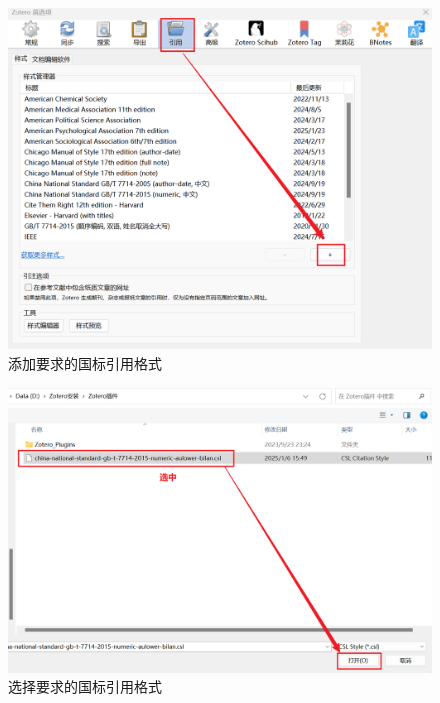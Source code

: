 \documentclass[]{ctexbook}
\theoremstyle{definition}
\theoremstyle{definition}
\theoremstyle{definition}
\theoremstyle{definition}
\theoremstyle{remark}
\begin{document}
\begin{figure}

{\centering \includegraphics[width=1\linewidth]{img/zotero-cite-cn/ciation_setting_1} 

}

\caption{添加要求的国标引用格式}\label{fig:ciation-setting-load}
\end{figure}

\begin{figure}

{\centering \includegraphics[width=1\linewidth]{img/zotero-cite-cn/ciation_setting_2} 

}

\caption{选择要求的国标引用格式}\label{fig:ciation-setting-select}
\end{figure}
\end{document}
